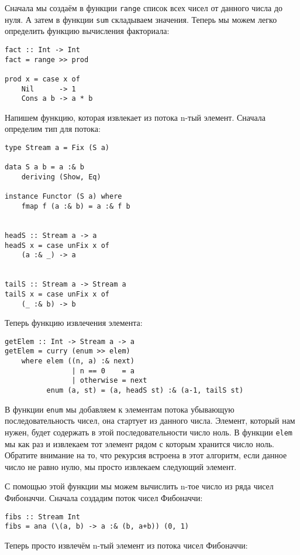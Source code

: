 Сначала мы создаём в функции \texttt{range} список всех чисел от данного
числа до нуля. А затем в функции \texttt{sum} складываем значения.
Теперь мы можем легко определить функцию вычисления факториала:

\begin{verbatim}
fact :: Int -> Int
fact = range >> prod
    
prod x = case x of
    Nil      -> 1 
    Cons a b -> a * b
\end{verbatim}

Напишем функцию, которая извлекает из потока n-тый элемент. Сначала
определим тип для потока:

\begin{verbatim}
type Stream a = Fix (S a)

data S a b = a :& b
    deriving (Show, Eq)

instance Functor (S a) where
    fmap f (a :& b) = a :& f b  


headS :: Stream a -> a
headS x = case unFix x of
    (a :& _) -> a


tailS :: Stream a -> Stream a
tailS x = case unFix x of
    (_ :& b) -> b
\end{verbatim}

Теперь функцию извлечения элемента:

\begin{verbatim}
getElem :: Int -> Stream a -> a
getElem = curry (enum >> elem) 
    where elem ((n, a) :& next) 
                | n == 0    = a
                | otherwise = next
          enum (a, st) = (a, headS st) :& (a-1, tailS st)
\end{verbatim}

В функции \texttt{enum} мы добавляем к элементам потока убывающую
последовательность чисел, она стартует из данного числа. Элемент,
который нам нужен, будет содержать в этой последовательности число ноль.
В функции \texttt{elem} мы как раз и извлекаем тот элемент рядом с
которым хранится число ноль. Обратите внимание на то, что рекурсия
встроена в этот алгоритм, если данное число не равно нулю, мы просто
извлекаем следующий элемент.

С помощью этой функции мы можем вычислить n-тое число из ряда чисел
Фибоначчи. Сначала создадим поток чисел Фибоначчи:

\begin{verbatim}
fibs :: Stream Int
fibs = ana (\(a, b) -> a :& (b, a+b)) (0, 1)
\end{verbatim}

Теперь просто извлечём n-тый элемент из потока чисел Фибоначчи:

